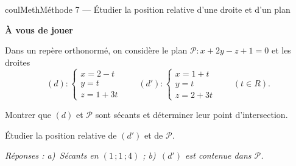 \documentclass[11pt,a4paper]{article}
\makeatletter
\newcommand{\R}{\mathbb{R}}
\newcommand{\N}{\mathbb{N}}
\newcommand{\Z}{\mathbb{Z}}
\newcommand{\Q}{\mathbb{Q}}
\newcommand{\vect}[1]{\overrightarrow{#1}}
\newcommand{\fois}[1]{\times{\color{coulExo}#1}}
\providecommand{\Cf}{\mathcal{C}\sb{f}}%
\providecommand{\Cg}{\mathcal{C}\sb{g}}%
\newcounter{lycee@signet}
\newcommand{\signet}[3][]{\stepcounter{lycee@signet}%
  \edef\lycee@dest{\if\relax\detokenize{#1}\relax
    signet.\arabic{lycee@signet}\else#1\fi}%
  \hypertarget{\lycee@dest}{}\bookmark[level=#2,dest=\lycee@dest]{#3}}
\def\R{R}\def\N{N}\def\Z{Z}\def\Q{Q}\def\vect#1{#1}\def\Cf{Cf}\def\Cg{Cg}\def\fois#1{×#1}%
\newcounter{methode}
\newenvironment{methodebox}[1][Méthode]{\stepcounter{methode}%
  \begin{boitecours}[phantom={\signet[methode-\arabic{methode}]{2}{#1}}]{coulMeth}{#1}}%
  {\end{boitecours}}
\newcommand{\etape}[1]{\par\smallskip\textbf{\color{coulMeth}#1}\par\nobreak\smallskip}
\newcommand{\reponse}[1]{\par\smallskip
  {\footnotesize\itshape\color{black!55}Réponses : #1}}
\makeatother
\begin{document}
\begin{methodebox}[Méthode 7 --- Étudier la position relative d'une droite et d'un plan]
\etape{À vous de jouer}
Dans un repère orthonormé, on considère le plan $\mathcal{P}\colon x+2y-z+1=0$ et les
droites
\[
(d)\colon\left\{\begin{array}{l} x=2-t\\ y=t\\ z=1+3t\end{array}\right.
\qquad
(d')\colon\left\{\begin{array}{l} x=1+t\\ y=t\\ z=2+3t\end{array}\right.
\qquad (t\in\R).
\]
\begin{questions}[label=\alph*)]
  \item Montrer que $(d)$ et $\mathcal{P}$ sont sécants et déterminer leur point
        d'intersection.
  \item Étudier la position relative de $(d')$ et de $\mathcal{P}$.
\end{questions}
\reponse{a)~Sécants en $(1\,;1\,;4)$ ;\; b)~$(d')$ est contenue dans $\mathcal{P}$.}
\end{methodebox}
\end{document}
